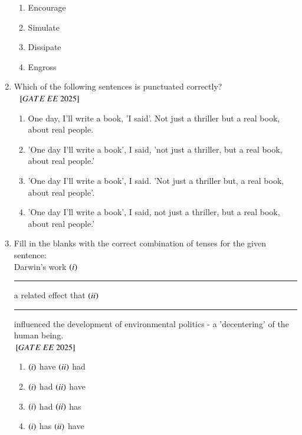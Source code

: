 \documentclass[journal,12pt,onecolumn]{IEEEtran}
\theoremstyle{remark}
\begin{document}
\begin{enumerate}
\begin{enumerate}[label=(\Alph*)]
\item Encourage \\
\item Simulate \\
\item  Dissipate \\
\item Engross \\
    \end{enumerate}
   \item Which of the following sentences is punctuated correctly? \\   \
${}\left[GATE\ EE\ 2025\right]$\\  
    \begin{enumerate}[label=(\Alph*)]
\item One day, I'll write a book, 'I said'. Not just a thriller but a real book, about real people. \\
\item 'One day I'll write a book', I said, 'not just a thriller, but a real book, about real people.' \\
\item 'One day I'll write a book', I said. 'Not just a thriller but, a real book, about real people'. \\
\item'One day I'll write a book', I said, not just a thriller, but a real book, about real people.' \\
    \end{enumerate}
   \item Fill in the blanks with the correct combination of tenses for the given sentence: \\ 
  Darwin's work  $\left(i\right)$\rule{2cm}{0.4pt} a related effect that  $\left(ii\right)$\rule{2cm}{0.4pt} influenced the development of environmental politics - a 'decentering' of the human being. \\   
 ${}\left[GATE\ EE\ 2025\right]$\\
    \begin{enumerate}[label=(\Alph*)]
\item  $\left(i\right)$ have  $\left(ii\right)$ had \\
\item  $\left(i\right)$ had  $\left(ii\right)$ have \\
\item  $\left(i\right)$ had  $\left(ii\right)$ has \\
\item  $\left(i\right)$ has  $\left(ii\right)$ have \\
    \end{enumerate}


\end{enumerate}
\end{document}
